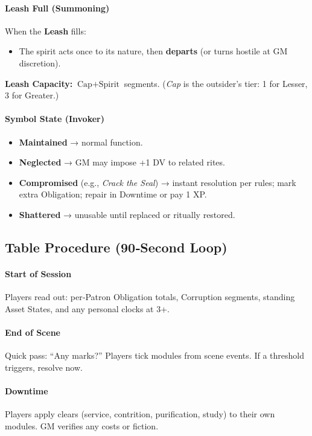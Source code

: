 \paragraph{Leash Full (Summoning)}
When the \textbf{Leash} fills:
\begin{itemize}
  \item The spirit acts once to its nature, then \textbf{departs} (or turns hostile at GM discretion).
\end{itemize}
\textbf{Leash Capacity:} \(\text{Cap} + \text{Spirit}\) segments. (\textit{Cap} is the outsider’s tier: 1 for Lesser, 3 for Greater.)

\paragraph{Symbol State (Invoker)}
\begin{itemize}
  \item \textbf{Maintained} → normal function.
  \item \textbf{Neglected} → GM may impose +1 DV to related rites.
  \item \textbf{Compromised} (e.g., \emph{Crack the Seal}) → instant resolution per rules; mark extra Obligation; repair in Downtime or pay 1 XP.
  \item \textbf{Shattered} → unusable until replaced or ritually restored.
\end{itemize}

\subsection{Table Procedure (90‑Second Loop)}
\label{subsec:module-procedure}
\paragraph{Start of Session}
Players read out: per‑Patron Obligation totals, Corruption segments, standing Asset States, and any personal clocks at 3+.

\paragraph{End of Scene}
Quick pass: “Any marks?” Players tick modules from scene events. If a threshold triggers, resolve now.

\paragraph{Downtime}
Players apply clears (service, contrition, purification, study) to their own modules. GM verifies any costs or fiction.

